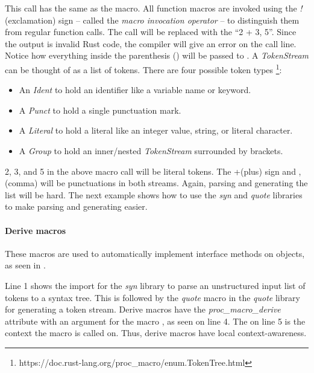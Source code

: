 This call has the same  as the macro.
All function macros are invoked using the \textit{!} (exclamation) sign -- called the \textit{macro invocation operator} -- to distinguish them from regular function calls.
The call will be replaced with the  ``2 + 3, 5''.
Since the output is invalid Rust code, the compiler will give an error on the call line.
Notice how everything inside the parenthesis () will be passed to .
A \textit{TokenStream} can be thought of as a list of tokens.
There are four possible token types \footnote{https://doc.rust-lang.org/proc\_macro/enum.TokenTree.html}:

\begin{itemize}
	\item An \textit{Ident} to hold an identifier like a variable name or keyword.
	\item A \textit{Punct} to hold a single punctuation mark.
	\item A \textit{Literal} to hold a literal like an integer value, string, or literal character.
	\item A \textit{Group} to hold an inner/nested \textit{TokenStream} surrounded by brackets.
\end{itemize}

2, 3, and 5 in the above macro call will be literal tokens.
The +(plus) sign and ,(comma) will be punctuations in both streams.
Again, parsing and generating the list will be hard.
The next example shows how to use the \textit{syn} and \textit{quote} libraries to make parsing and generating easier.

\paragraph{Derive macros}
These macros are used to automatically implement interface methods on objects, as seen in .


Line 1 shows the import for the \textit{syn} library to parse an unstructured input list of tokens to a syntax tree.
This is followed by the \textit{quote} macro in the \textit{quote} library for generating a token stream.
Derive macros have the \textit{proc\_macro\_derive} attribute with an argument for the macro , as seen on line 4.
The  on line 5 is the context the macro is called on.
Thus, derive macros have local context-awareness.

